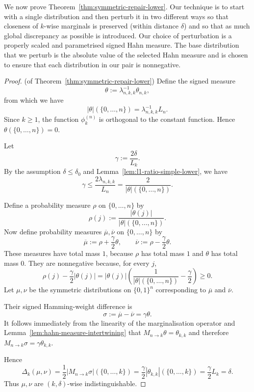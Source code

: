 \documentclass[manuscript,nonacm]{acmart}
\begin{document}
We now prove Theorem~\ref{thm:symmetric-repair-lower}. Our technique is to start with a single distribution and then perturb it in two different ways so that closeness of $k$-wise marginals is preserved (within distance $\delta$) and so that as much global discrepancy as possible is introduced. Our choice of perturbation is a properly scaled and parametrised signed Hahn measure. The base distribution that we perturb is the absolute value of the selected Hahn measure and is chosen to ensure that each distribution in our pair is nonnegative.

\begin{proof}(of Theorem~\ref{thm:symmetric-repair-lower})
Define the signed measure
\[
    \theta:=\lambda_{n,k,k}^{-1}\theta_{n,k},
\]
from which we have
\[
    |\theta|(\{0,\dots,n\})=\lambda_{n,k,k}^{-1}L_n.
\]
Since \(k\ge 1\), the function \(\phi_k^{(n)}\) is orthogonal to the
constant function. Hence $\theta(\{0,\dots,n\})=0$.

Let
\[
    \gamma:=\frac{2\delta}{L_k}.
\]
By the assumption \(\delta\le\delta_0\) and Lemma~\ref{lem:l1-ratio-simple-lower}, we have
\[
    \gamma
    \le
    \frac{2\lambda_{n,k,k}}{L_n}
    =
    \frac{2}{|\theta|(\{0,\dots,n\})}.
\]

Define a probability measure \(\rho\) on \(\{0,\dots,n\}\) by
\[
    \rho(j):=\frac{|\theta(j)|}{|\theta|(\{0,\dots,n\})}.
\]
Now define probability measures \(\overline{\mu},\overline{\nu}\) on
\(\{0,\dots,n\}\) by
\[
    \overline{\mu}:=\rho+\frac{\gamma}{2}\theta,
    \qquad
    \overline{\nu}:=\rho-\frac{\gamma}{2}\theta.
\]
These measures have total mass \(1\), because \(\rho\) has total mass
\(1\) and \(\theta\) has total mass \(0\). They are nonnegative because,
for every \(j\),
\[
    \rho(j)-\frac{\gamma}{2}|\theta(j)|
    =
    |\theta(j)|
    \left(
        \frac{1}{|\theta|(\{0,\dots,n\})}
        -
        \frac{\gamma}{2}
    \right)
    \ge 0.
\]
Let \(\mu,\nu\) be the symmetric distributions on
\(\{0,1\}^n\) corresponding to $\overline{\mu}$ and $\overline{\nu}$.

Their signed Hamming-weight difference is
\[
    \sigma:=\overline{\mu}-\overline{\nu}
    =
    \gamma\theta.
\]
It follows immediately from the linearity of the marginalisation operator and Lemma~\ref{lem:hahn-measure-intertwining} that $M_{n\to k}\theta=\theta_{k,k}$ and therefore $M_{n\to k}\sigma=\gamma\theta_{k,k}$.

Hence
\[
    \Delta_k(\mu,\nu)=
    \frac12 |M_{n\to k}\sigma|(\{0,\dots,k\})=
    \frac{\gamma}{2}|\theta_{k,k}|(\{0,\dots,k\}) =
    \frac{\gamma}{2}L_k =
    \delta.
\]
Thus \(\mu,\nu\) are \((k,\delta)\)-wise indistinguishable.


\end{proof}
\end{document}
